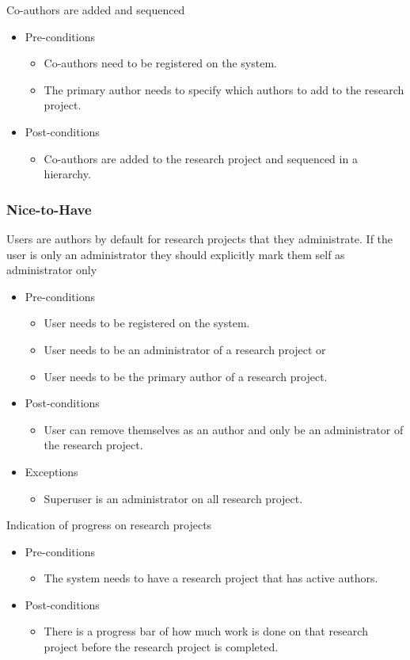 \documentclass[a4paper,12pt]{report}
\begin{document}
	Co-authors are added and sequenced
	\begin{itemize}
		\item Pre-conditions
			\begin{itemize}
				\item Co-authors need to be registered on the system.
				\item The primary author needs to specify which authors to add to the research project.
			\end{itemize}
		\item Post-conditions
			\begin{itemize}
				\item Co-authors are added to the research project and sequenced in a hierarchy.
			\end{itemize}
	\end{itemize}

\subsubsection{Nice-to-Have}
	Users are authors by default for research projects that they administrate. If the user is only an administrator they should explicitly mark them self as administrator only
	\begin{itemize}
		\item Pre-conditions
			\begin{itemize}
				\item User needs to be registered on the system.
				\item User needs to be an administrator of a research project or
				\item User needs to be the primary author of a research project.
			\end{itemize}
		\item Post-conditions
			\begin{itemize}
				\item User can remove themselves as an author and only be an administrator of the research project.
			\end{itemize}
		\item Exceptions
			\begin{itemize}
				\item Superuser is an administrator on all research project.
			\end{itemize}
	\end{itemize}

	Indication of progress on research projects
	\begin{itemize}
		\item Pre-conditions
			\begin{itemize}
				\item The system needs to have a research project that has active authors.
			\end{itemize}
		\item Post-conditions
			\begin{itemize}
				\item There is a progress bar of how much work is done on that research project before the research project is completed.
			\end{itemize}
	\end{itemize}
\end{document}
